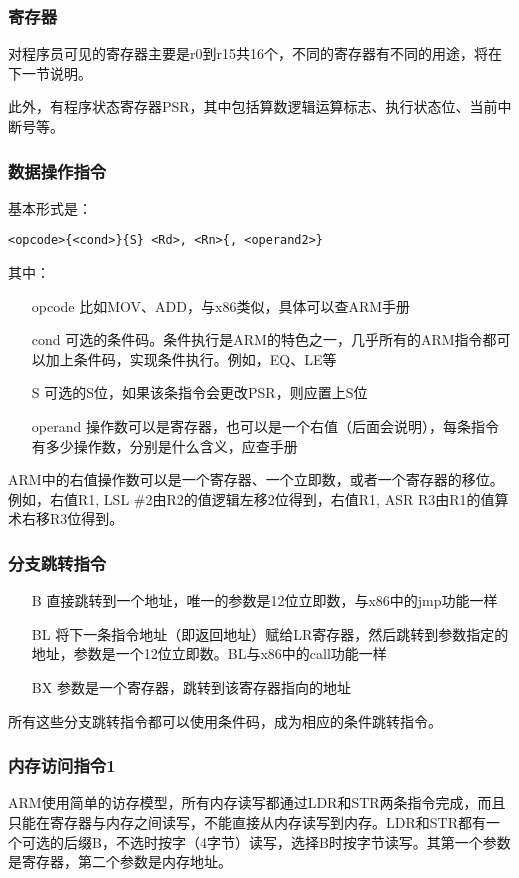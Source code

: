 \subsubsection{寄存器}
对程序员可见的寄存器主要是r0到r15共16个，不同的寄存器有不同的用途，将在下一节说明。

此外，有程序状态寄存器PSR，其中包括算数逻辑运算标志、执行状态位、当前中断号等。

\subsubsection{数据操作指令}
基本形式是：
\begin{lstlisting}[numbers=none]
<opcode>{<cond>}{S} <Rd>, <Rn>{, <operand2>}
\end{lstlisting}
其中：
\begin{itemize}
\item[opcode] 比如MOV、ADD，与x86类似，具体可以查ARM手册
\item[cond] 可选的条件码。条件执行是ARM的特色之一，几乎所有的ARM指令都可以加上条件码，实现条件执行。例如，EQ、LE等
\item[S] 可选的S位，如果该条指令会更改PSR，则应置上S位
\item[operand] 操作数可以是寄存器，也可以是一个右值（后面会说明），每条指令有多少操作数，分别是什么含义，应查手册
\end{itemize}

ARM中的右值操作数可以是一个寄存器、一个立即数，或者一个寄存器的移位。例如，右值R1, LSL \#2由R2的值逻辑左移2位得到，右值R1, ASR R3由R1的值算术右移R3位得到。

\subsubsection{分支跳转指令}
\begin{itemize}
\item[B] 直接跳转到一个地址，唯一的参数是12位立即数，与x86中的jmp功能一样
\item[BL] 将下一条指令地址（即返回地址）赋给LR寄存器，然后跳转到参数指定的地址，参数是一个12位立即数。BL与x86中的call功能一样
\item[BX] 参数是一个寄存器，跳转到该寄存器指向的地址
\end{itemize}
所有这些分支跳转指令都可以使用条件码，成为相应的条件跳转指令。

\subsubsection{内存访问指令1}
ARM使用简单的访存模型，所有内存读写都通过LDR和STR两条指令完成，而且只能在寄存器与内存之间读写，不能直接从内存读写到内存。LDR和STR都有一个可选的后缀B，不选时按字（4字节）读写，选择B时按字节读写。其第一个参数是寄存器，第二个参数是内存地址。

